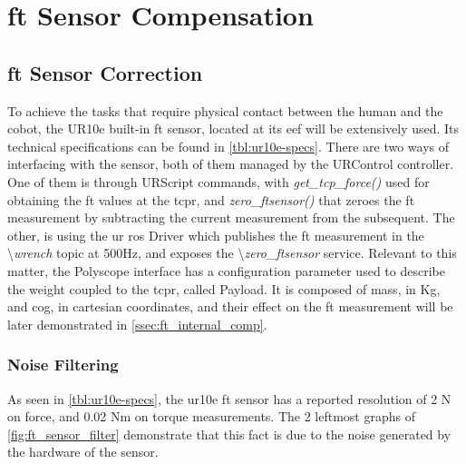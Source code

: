 \chapter{\acl{ft} Sensor Compensation}
\label{chapter:ft-sensor-correction}


\section{\ac{ft} Sensor Correction}

\par To achieve the tasks that require physical contact between the human and the cobot, the UR10e built-in \ac{ft} sensor, located at its \ac{eef} will be extensively used. Its technical specifications can be found in \autoref{tbl:ur10e-specs}. There are two ways of interfacing with the sensor, both of them managed by the URControl controller. One of them is through URScript commands, with \textit{get\_tcp\_force()} used for obtaining the \ac{ft} values at the \acs{tcpr}, and \textit{zero\_ftsensor()} that zeroes the \ac{ft} measurement by subtracting the current measurement from the subsequent. The other, is using the \ac{ur} \ac{ros} Driver which publishes the \ac{ft} measurement in the \textbackslash\textit{wrench} topic at 500Hz, and exposes the \textbackslash\textit{zero\_ftsensor} service. Relevant to this matter, the Polyscope interface has a configuration parameter used to describe the weight coupled to the \acs{tcpr}, called Payload. It is composed of mass, in Kg, and \ac{cog}, in cartesian coordinates, and their effect on the \ac{ft} measurement will be later demonstrated in \autoref{ssec:ft_internal_comp}.

\subsection{Noise Filtering}


\par As seen in \autoref{tbl:ur10e-specs}, the \ac{ur10e} \ac{ft} sensor has a reported resolution of 2 N on force, and 0.02 Nm on torque measurements. The 2 leftmost graphs of \autoref{fig:ft_sensor_filter} demonstrate that this fact is due to the noise generated by the hardware of the sensor. 

